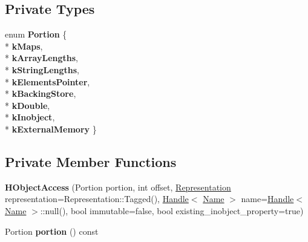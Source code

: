 \subsection*{Private Types}
\begin{DoxyCompactItemize}
\item 
enum {\bfseries Portion} \{ \\*
{\bfseries k\+Maps}, 
\\*
{\bfseries k\+Array\+Lengths}, 
\\*
{\bfseries k\+String\+Lengths}, 
\\*
{\bfseries k\+Elements\+Pointer}, 
\\*
{\bfseries k\+Backing\+Store}, 
\\*
{\bfseries k\+Double}, 
\\*
{\bfseries k\+Inobject}, 
\\*
{\bfseries k\+External\+Memory}
 \}\hypertarget{classv8_1_1internal_1_1_h_object_access_ad8ee9fef144863a3ff507a12e95a43f9}{}\label{classv8_1_1internal_1_1_h_object_access_ad8ee9fef144863a3ff507a12e95a43f9}

\end{DoxyCompactItemize}
\subsection*{Private Member Functions}
\begin{DoxyCompactItemize}
\item 
{\bfseries H\+Object\+Access} (Portion portion, int offset, \hyperlink{classv8_1_1internal_1_1_representation}{Representation} representation=Representation\+::\+Tagged(), \hyperlink{classv8_1_1internal_1_1_handle}{Handle}$<$ \hyperlink{classv8_1_1internal_1_1_name}{Name} $>$ name=\hyperlink{classv8_1_1internal_1_1_handle}{Handle}$<$ \hyperlink{classv8_1_1internal_1_1_name}{Name} $>$\+::null(), bool immutable=false, bool existing\+\_\+inobject\+\_\+property=true)\hypertarget{classv8_1_1internal_1_1_h_object_access_a1df90bc46d3dbf86c2f4bd6df30ac5b8}{}\label{classv8_1_1internal_1_1_h_object_access_a1df90bc46d3dbf86c2f4bd6df30ac5b8}

\item 
Portion {\bfseries portion} () const \hypertarget{classv8_1_1internal_1_1_h_object_access_a52d78811c83571ea12264afb2eab61d0}{}\label{classv8_1_1internal_1_1_h_object_access_a52d78811c83571ea12264afb2eab61d0}

\end{DoxyCompactItemize}
